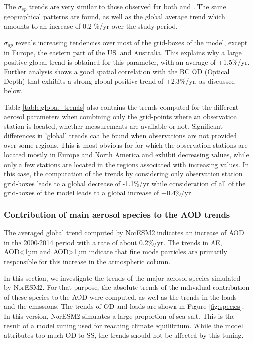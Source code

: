 \documentclass[acp, manuscript]{copernicus}
\begin{document}
The $\sigma_{sp}$ trends are very similar to those observed for both  and . The same geographical patterns are found, as well as the global average trend which amounts to an increase of 0.2 \%/yr over the study period.

$\sigma_{ap}$ reveals increasing tendencies over most of the grid-boxes of the model, except in Europe, the eastern part of the US, and Australia. This explains why a large positive global trend is obtained for this parameter, with an average of +1.5\%/yr. Further analysis shows a good spatial correlation with the BC OD (Optical Depth) that exhibits a strong global positive trend of +2.3\%/yr, as discussed below.

Table \ref{table:global_trends} also contains the trends computed for the different aerosol parameters when combining only the grid-points where an observation station is located, whether measurements are available or not. Significant differences in 'global' trends can be found when observations are not provided over some regions. This is most obvious for  for which the observation stations are located mostly in Europe and North America and exhibit decreasing values, while only a few stations are located in the regions associated with increasing values. In this case, the computation of the trends by considering only observation station grid-boxes leads to a global decrease of -1.1\%/yr while consideration of all of the grid-boxes of the model leads to a global increase of +0.4\%/yr.


\subsubsection{Contribution of main aerosol species to the AOD trends}

The averaged global trend computed by NorESM2 indicates an increase of AOD in the 2000-2014 period with a rate of about 0.2\%/yr. The trends in AE, AOD<1µm and AOD>1µm indicate that fine mode particles are primarily responsible for this increase in the atmospheric column.

In this section, we investigate the trends of the major aerosol species simulated by NorESM2. For that purpose, the absolute trends of the individual contribution of these species to the AOD were computed, as well as the trends in the loads and the emissions. The trends of OD and loads are shown in Figure \ref{fig:species}. In this version, NorESM2 simulates a large proportion of sea salt. This is the result of a model tuning used for reaching climate equilibrium. While the model attributes too much OD to SS, the trends should not be affected by this tuning.
\end{document}
